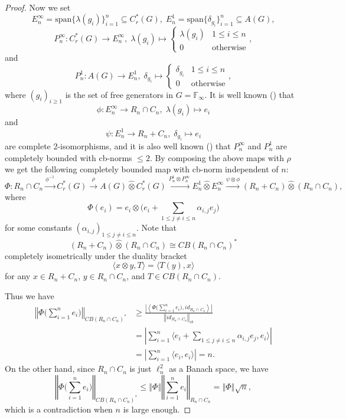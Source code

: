 \documentclass[10pt]{amsart}
\numberwithin{thm}{section}
\numberwithin{equation}{section}
\begin{document}
\begin{proof}
Now we set
	$$E^\infty_n = \text{span}\{\lambda(g_i)\}^n_{i=1} \subseteq C^*_r(G), \; E^1_n = \text{span}\{\delta_{g_i}\}^n_{i=1} \subseteq A(G),$$
	$$P^\infty_n : C^*_r(G) \rightarrow E^\infty_n,\; \lambda(g_i) \mapsto
	\left\{ \begin{array}{ll} \lambda(g_i) & 1\le i\le n\\ 0 & \text{otherwise} \end{array}\right.,$$
and
	\begin{equation}\label{P1}
	P^1_n : A(G) \rightarrow E^1_n,\; \delta_{g_i} \mapsto
	\left\{ \begin{array}{ll} \delta_{g_i} & 1\le i\le n\\ 0 & \text{otherwise} \end{array}\right.,
	\end{equation}
where $(g_i)_{i \ge 1}$ is the set of free generators in $G=\mathbb{F}_\infty$.
It is well known (\cite[section 9.7]{P03}) that
	$$\phi : E^\infty_n \rightarrow R_n \cap C_n,\; \lambda(g_i) \mapsto e_i$$
and
	\begin{equation}\label{E1}
	\psi : E^1_n \rightarrow R_n + C_n,\; \delta_{g_i} \mapsto e_i
	\end{equation}
are complete 2-isomorphisms, and it is also well known (\cite[section 9.7]{P03})
that $P^\infty_n$ and $P^1_n$ are completely bounded with cb-norms $\le 2$.
By composing the above maps with $\rho$ we get the following completely bounded map with cb-norm independent of $n$: 
	$$\Phi : R_n \cap C_n \stackrel{\phi^{-1}}{\longrightarrow} C^*_r(G) \stackrel{\rho}{\longrightarrow} A(G) {\widehat{\otimes}} C^*_r(G) \stackrel{P^1_n\otimes
	P^\infty_n}{\longrightarrow} E^1_n {\widehat{\otimes}} E^\infty_n \stackrel{\psi \otimes \phi}{\longrightarrow} (R_n + C_n) {\widehat{\otimes}} (R_n\cap C_n),$$
where
	$$\Phi(e_i) = e_i \otimes \Big(e_i + \sum_{1\le j\neq i\le n}\alpha_{i,j}e_j \Big)$$ for some constants $(\alpha_{i,j})_{1\le j\neq i\le n}$.
Note that
	$$(R_n + C_n) {\widehat{\otimes}} (R_n\cap C_n) \cong CB(R_n\cap C_n)^*$$
completely isometrically under the duality bracket
	$${\langle} x\otimes y, T {\rangle} = {\langle} T(y), x {\rangle}$$
for any $x\in R_n+C_n$, $y\in R_n\cap C_n$, and $T \in CB(R_n\cap C_n)$.

Thus we have
	\begin{align*}
	{\left\Vert{\Phi \Big(\sum^n_{i=1}e_i\Big)}\right\Vert}_{CB(R_n\cap C_n)^*} &
	\ge \frac{{\left\vert{\left\langle \Phi\Big(\sum^n_{i=1}e_i\Big), id_{R_n\cap\, C_n} \right\rangle}\right\vert}}{{\left\Vert{id_{R_n\cap\, C_n}}\right\Vert}_{cb}}\\
	& = {\left\vert{ \sum^n_{i=1} {\langle} e_i + \sum_{1\le j\neq i\le n}\alpha_{i,j}e_j, e_i {\rangle} }\right\vert}\\
	& = {\left\vert{ \sum^n_{i=1} {\langle} e_i, e_i {\rangle} }\right\vert} = n.
	\end{align*}
On the other hand, since $R_n \cap C_n$ is just $\ell^2_n$ as a Banach space, we have
	$${\left\Vert{\Phi \Big(\sum^n_{i=1}e_i\Big)}\right\Vert}_{CB(R_n\cap C_n)^*} \le {\left\Vert{\Phi}\right\Vert} {\left\Vert{\sum^n_{i=1}e_i}\right\Vert}_{R_n \cap C_n} = {\left\Vert{\Phi}\right\Vert}\sqrt{n},$$
which is a contradiction when $n$ is large enough.


\end{proof}
\end{document}
